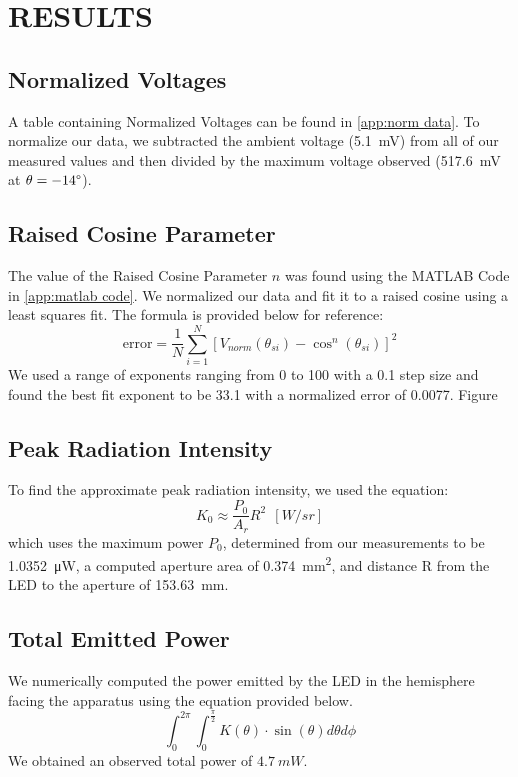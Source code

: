 \section{RESULTS}

\subsection{Normalized Voltages}
A table containing Normalized Voltages can be found in \autoref{app:norm data}. To normalize our data, we subtracted the ambient voltage (\SI{5.1}{\milli\volt}) from all of our measured values and then divided by the maximum voltage observed (\SI{517.6}{\milli\volt} at $\theta = -14\degree$).
\subsection{Raised Cosine Parameter}
The value of the Raised Cosine Parameter $n$ was found using the MATLAB Code in \autoref{app:matlab code}. We normalized our data and fit it to a raised cosine using a least squares fit. The formula is provided below for reference:
\[\text{error} = \frac{1}{N}\sum_{i=1}^{N}[V_{norm}(\theta_{si}) - \cos^{n}(\theta_{si})]^{2}\]
We used a range of exponents ranging from 0 to 100 with a 0.1 step size and found the best fit exponent to be 33.1 with a normalized error of 0.0077. Figure %

\subsection{Peak Radiation Intensity}
To find the approximate peak radiation intensity, we used the equation:
\[K_{0}\approx \frac{P_{0}}{A_{r}}R^{2}\: \: [W/sr]\]
which uses the maximum power $P_0$, determined from our measurements to be \SI{1.0352}{\micro\watt}, a computed aperture area of \SI{0.374}{mm^2}, and distance R from the LED to the aperture of \SI{153.63}{mm}. 
\subsection{Total Emitted Power}
We numerically computed the power emitted by the LED in the hemisphere facing the apparatus using the equation provided below.
\[\int_{0}^{2\pi}{\int_{0}^{\frac{\pi}{2}}K(\theta)\cdot \sin(\theta) d \theta d\phi}\]
We obtained an observed total power of $\SI{4.7}{mW}$.

